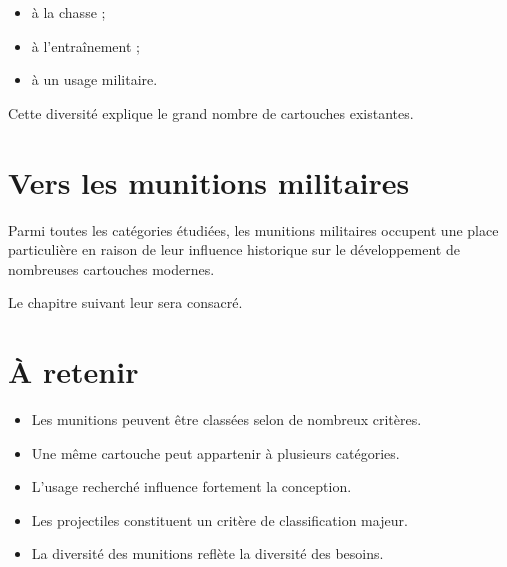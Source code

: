 \begin{itemize}
    \item à la chasse ;
    \item à l'entraînement ;
    \item à un usage militaire.
\end{itemize}

Cette diversité explique le grand nombre de cartouches existantes.

\section{Vers les munitions militaires}

Parmi toutes les catégories étudiées, les munitions militaires occupent une
place particulière en raison de leur influence historique sur le développement
de nombreuses cartouches modernes.

Le chapitre suivant leur sera consacré.

\section{À retenir}

\begin{aretenir}

\begin{itemize}
    \item Les munitions peuvent être classées selon de nombreux critères.
    \item Une même cartouche peut appartenir à plusieurs catégories.
    \item L'usage recherché influence fortement la conception.
    \item Les projectiles constituent un critère de classification majeur.
    \item La diversité des munitions reflète la diversité des besoins.
\end{itemize}

\end{aretenir}
